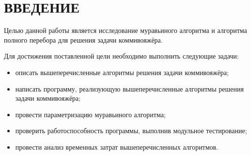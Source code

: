 \chapter*{\hfill{\centering ВВЕДЕНИЕ}\hfill}

Целью данной работы является исследование муравьиного алгоритма и алгоритма полного перебора для решения задачи коммивояжёра.

\label{sec:goals}
Для достижения поставленной цели необходимо выполнить следующие задачи:
\begin{itemize}[label=---]
	\item описать вышеперечисленные алгоритмы решения задачи коммивояжёра;
	\item написать программу, реализующую вышеперечисленные алгоритмы решения задачи коммивояжёра;
	\item провести параметризацию муравьиного алгоритма;
	\item проверить работоспособность программы, выполнив модульное тестирование;
	\item провести анализ временных затрат вышеперечисленных алгоритмов.
\end{itemize}




